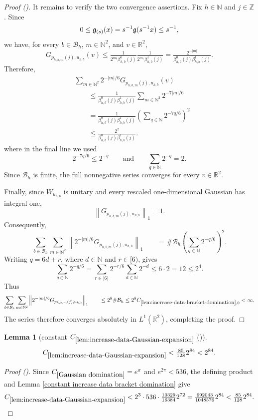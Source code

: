 \documentclass[12pt,reqno]{amsart}
\newcommand{\auto}{{({\tiny\faCar})}}
\theoremstyle{plain}
\newtheorem{lemma}[theorem]{Lemma}
\numberwithin{equation}{section}
\theoremstyle{remark}
\newcommand{\using}[1]{}
\begin{document}
\begin{proof}[Proof \auto]
It remains to verify the two convergence assertions. Fix
\(h\in\mathbb N\) and \(j\in\mathbb Z\). Since
\[
0\leq\mathfrak{g}_{(s)}(x)
=
s^{-1}\mathfrak{g}(s^{-1}x)
\leq s^{-1},
\]
we have, for every \(b\in\mathcal B_h\), \(m\in\mathbb N^2\),
and \(v\in\mathbb R^2\),
\[
G_{p_{h,b,m}(j),u_{h,b}}(v) \leq \tfrac{1}{ 2^{m_0}\beta_{h,b}^0(j) } \tfrac{1}{ 2^{m_1}\beta_{h,b}^1(j) } = \tfrac{2^{-|m|}}{ \beta_{h,b}^0(j)\beta_{h,b}^1(j) }.
\]
Therefore,
\[
\begin{aligned}
&
\sum_{m\in\mathbb N^2}
2^{-|m|/6}
G_{p_{h,b,m}(j),u_{h,b}}(v)
\\
&\qquad\leq
\frac{1}{
\beta_{h,b}^0(j)\beta_{h,b}^1(j)
}
\sum_{m\in\mathbb N^2}
2^{-7|m|/6}
\\
&\qquad=
\frac{1}{
\beta_{h,b}^0(j)\beta_{h,b}^1(j)
}
\left(
\sum_{q\in\mathbb N}2^{-7q/6}
\right)^2
\\
&\qquad\leq
\frac{2^2}{
\beta_{h,b}^0(j)\beta_{h,b}^1(j)
}.
\end{aligned}
\]
where in the final line we used
\[
2^{-7q/6}\leq2^{-q}
\qquad\text{and}\qquad
\sum_{q\in\mathbb N}2^{-q}=2.
\]
Since \(\mathcal B_h\) is finite, the full nonnegative series
converges for every \(v\in\mathbb R^2\).

Finally, since \(W_{u_{h,b}}\) is unitary and every rescaled
one-dimensional Gaussian has integral one,
\[
\left\|
G_{p_{h,b,m}(j),u_{h,b}}
\right\|_1
=
1.
\]
Consequently,
\[
\sum_{b\in\mathcal B_h} \sum_{m\in\mathbb N^2} \left\| 2^{-|m|/6} G_{p_{h,b,m}(j),u_{h,b}} \right\|_1 \qquad= \#\mathcal B_h \left( \sum_{q\in\mathbb N}2^{-q/6} \right)^2.
\]
Writing \(q=6d+r\), where \(d\in\mathbb N\) and \(r\in[6)\), gives
\[
\sum_{q\in\mathbb N}2^{-q/6} = \sum_{r\in[6)} 2^{-r/6} \sum_{d\in\mathbb N}2^{-d} \leq 6\cdot2 = 12 \leq2^4.
\]
Thus
\[
\sum_{b\in\mathcal B_h} \sum_{m\in\mathbb N^2} \left\| 2^{-|m|/6} G_{p_{h,b,m}(j),u_{h,b}} \right\|_1 \qquad\leq 2^8\#\mathcal B_h \leq 2^8 C_{\ref{lem:increase-data-bracket-domination},0} < \infty.
\]
The series therefore converges absolutely in
\(L^1(\mathbb R^2)\), completing the proof.
\end{proof}

\begin{lemma}[constant $C_{\ref{lem:increase-data-Gaussian-expansion}}$ \auto]\label{constant increase data Gaussian expansion}\using{lem:increase-data-bracket-domination}\using{constant increase data bracket domination}\using{Gaussian domination}\using{lem:increase-data-Gaussian-expansion}
\begin{equation}\label{constant increase data Gaussian expansion bound}
C_{\ref{lem:increase-data-Gaussian-expansion}}
<\tfrac{85}{128}2^{84}<2^{84}.
\end{equation}
\end{lemma}
\begin{proof}[Proof \auto]
Since $C_{\ref{Gaussian domination}}=e^\pi$ and $e^{2\pi}<536$, the defining product and Lemma \ref{constant increase data bracket domination} give
\[
C_{\ref{lem:increase-data-Gaussian-expansion}}
<2^3\cdot536\cdot\tfrac{10329}{16384}2^{72}
=\tfrac{692043}{1048576}2^{84}
<\tfrac{85}{128}2^{84}.
\]
\end{proof}
\end{document}
